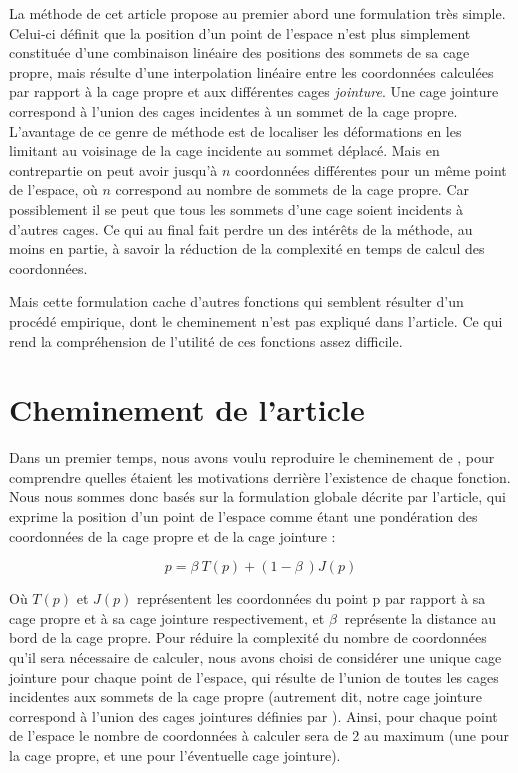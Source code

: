 La méthode de cet article propose au premier abord une formulation
très simple. Celui-ci définit que la position d'un point de l'espace
n'est plus simplement constituée d'une combinaison linéaire des
positions des sommets de sa cage propre, mais résulte d'une
interpolation linéaire entre les coordonnées calculées par rapport à
la cage propre et aux différentes cages \textit{jointure}. Une cage
jointure correspond à l'union des cages incidentes à un sommet de la
cage propre. L'avantage de ce genre de méthode est de localiser les
déformations en les limitant au voisinage de la cage incidente au
sommet déplacé. Mais en contrepartie on peut avoir jusqu'à $n$
coordonnées différentes pour un même point de l'espace, où $n$
correspond au nombre de sommets de la cage propre. Car possiblement il
se peut que tous les sommets d'une cage soient incidents à d'autres
cages. Ce qui au final fait perdre un des intérêts de la méthode, au
moins en partie, à savoir la réduction de la complexité en temps de
calcul des coordonnées.

Mais cette formulation cache d'autres fonctions qui semblent résulter
d'un procédé empirique, dont le cheminement n'est pas expliqué dans
l'article. Ce qui rend la compréhension de l'utilité de ces fonctions
assez difficile.

\section{Cheminement de l'article}
Dans un premier temps, nous avons voulu reproduire le cheminement de
\cite{GPCP13}, pour comprendre quelles étaient les motivations
derrière l'existence de chaque fonction. Nous nous sommes donc basés
sur la formulation globale décrite par l'article, qui exprime la
position d'un point de l'espace comme étant une pondération des
coordonnées de la cage propre et de la cage jointure :

\begin{equation}
  p = \beta~ T(p)  + (1 - \beta~) J(p) 
  \label{MELgen}
\end{equation}

Où $T(p)$ et $J(p)$ représentent les coordonnées du point p par
rapport à sa cage propre et à sa cage jointure respectivement, et
$\beta~$ représente la distance au bord de la cage propre. Pour
réduire la complexité du nombre de coordonnées qu'il sera nécessaire
de calculer, nous avons choisi de considérer une unique cage jointure
pour chaque point de l'espace, qui résulte de l'union de toutes les
cages incidentes aux sommets de la cage propre (autrement dit, notre
cage jointure correspond à l'union des cages jointures définies par
\cite{GPCP13}). Ainsi, pour chaque point de l'espace le nombre de
coordonnées à calculer sera de 2 au maximum (une pour la cage propre,
et une pour l'éventuelle cage jointure).

